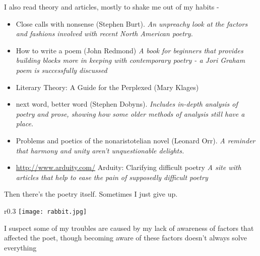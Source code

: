 \documentclass[11pt]{article}
\begin{document}
I also read theory and articles, mostly to shake me out of my habits - 
\begin{itemize}
\item Close calls with nonsense (Stephen Burt). \textit{An unpreachy look at the factors and fashions involved with recent North American poetry.}
\item How to write a poem (John Redmond) \textit{A book for beginners that provides building blocks more in keeping with contemporary poetry - a Jori Graham poem is successfully discussed}
\item Literary Theory: A Guide for the Perplexed (Mary Klages)
\item next word, better word (Stephen Dobyns). \textit{Includes in-depth analysis of poetry and prose, showing how some older methods of analysis still have a place.}
\item Problems and poetics of the nonaristotelian novel (Leonard Orr). \textit{A reminder that harmony and unity aren't unquestionable delights.} 
\item \url{http://www.arduity.com/} Arduity: Clarifying difficult poetry \textit{A site with articles that help to ease the pain of supposedly difficult poetry}
\end{itemize}


Then there's the poetry itself. Sometimes I just give up.

\begin{wrapfigure}{r}{0.3\textwidth}
\centering
\texttt{[image: rabbit.jpg]}
\end{wrapfigure}
I suspect some of my troubles are caused by my lack of awareness of factors that affected the poet, though becoming aware of these factors doesn't always solve everything
\end{document}
